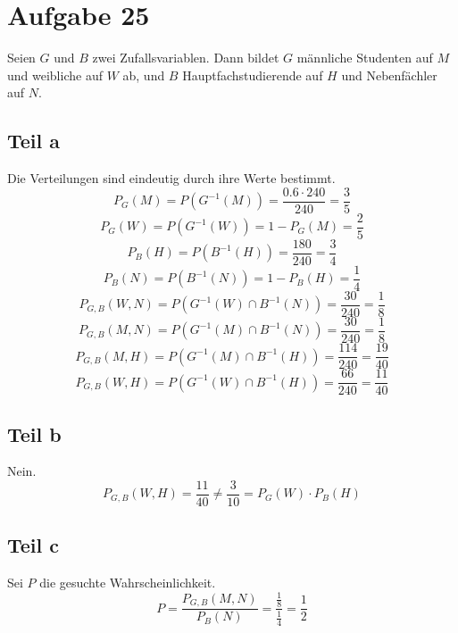 \documentclass[10pt,a4paper]{article}
\begin{document}
\section{Aufgabe 25}
Seien $G$ und $B$ zwei Zufallsvariablen.
Dann bildet $G$ männliche Studenten auf $M$ und weibliche auf $W$ ab, und $B$ Hauptfachstudierende auf $H$ und Nebenfächler auf $N$.

\subsection{Teil a}
Die Verteilungen sind eindeutig durch ihre Werte bestimmt.
\begin{equation}
  P_{G}(M) = P(G^{-1}(M)) = \frac{0.6 \cdot 240}{240} = \frac{3}{5}
\end{equation}
\begin{equation}
  P_{G}(W) = P(G^{-1}(W)) = 1 - P_{G}(M) = \frac{2}{5}
\end{equation}
\begin{equation}
  P_{B}(H) = P(B^{-1}(H)) = \frac{180}{240} = \frac{3}{4}
\end{equation}
\begin{equation}
  P_{B}(N) = P(B^{-1}(N)) = 1 - P_{B}(H) = \frac{1}{4}
\end{equation}
\begin{equation}
  P_{G,B}(W, N) = P(G^{-1}(W) \cap B^{-1}(N)) = \frac{30}{240} = \frac{1}{8}
\end{equation}
\begin{equation}
  P_{G,B}(M, N) = P(G^{-1}(M) \cap B^{-1}(N)) = \frac{30}{240} = \frac{1}{8}
\end{equation}
\begin{equation}
  P_{G,B}(M, H) = P(G^{-1}(M) \cap B^{-1}(H)) = \frac{114}{240} = \frac{19}{40}
\end{equation}
\begin{equation}
  P_{G,B}(W, H) = P(G^{-1}(W) \cap B^{-1}(H)) = \frac{66}{240} = \frac{11}{40}
\end{equation}

\subsection{Teil b}
Nein.
\begin{equation}
  P_{G,B}(W, H) = \frac{11}{40} \neq \frac{3}{10} = P_{G}(W) \cdot P_{B}(H)
\end{equation}

\subsection{Teil c}
Sei $P$ die gesuchte Wahrscheinlichkeit.
\begin{equation}
  P = \frac{P_{G,B}(M, N)}{P_{B}(N)} = \frac{\frac{1}{8}}{\frac{1}{4}} = \frac{1}{2}
\end{equation}
\end{document}
